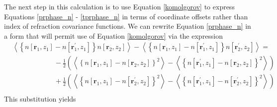 The next step in this calculation is to use Equation \ref{komolgorov}
to express Equations \ref{prphase_n} - \ref{tprphase_n} in terms of
coordinate offsets rather than index of refraction covariance
functions.  We can rewrite Equation \ref{prphase_n} in a form that
will permit use of Equation \ref{komolgorov} via the expression
\begin{equation}\label{simplify}
\begin{split}
&\left\langle \left\{n\left[\boldsymbol{r}_{1},z_{1}\right] - n\left[\boldsymbol{r}^{\prime}_{1},z_{1}\right]\right\}n\left[\boldsymbol{r}_{2},z_{2}\right]\right\rangle -
\left\langle \left\{n\left[\boldsymbol{r}_{1},z_{1}\right] - n\left[\boldsymbol{r}^{\prime}_{1},z_{1}\right]\right\}n\left[\boldsymbol{r}^{\prime}_{2},z_{2}\right]\right\rangle = \\
&\quad\quad\quad\quad\quad\quad
-\frac{1}{2} \left(\left\langle \left\{n\left[\boldsymbol{r}_{1},z_{1}\right] - n\left[\boldsymbol{r}_{2},z_{2}\right]\right\}^{2}\right\rangle - 
\left\langle \left\{n\left[\boldsymbol{r}^{\prime}_{1},z_{1}\right] - n\left[\boldsymbol{r}_{2},z_{2}\right]\right\}^{2}\right\rangle\right) \\
&\quad\quad\quad\quad\quad\quad
+\frac{1}{2} \left(\left\langle \left\{n\left[\boldsymbol{r}_{1},z_{1}\right] - n\left[\boldsymbol{r}^{\prime}_{2},z_{2}\right]\right\}^{2}\right\rangle - 
\left\langle \left\{n\left[\boldsymbol{r}^{\prime}_{1},z_{1}\right] - n\left[\boldsymbol{r}^{\prime}_{2},z_{2}\right]\right\}^{2}\right\rangle\right) \\
\end{split}
\end{equation}
This substitution yields
